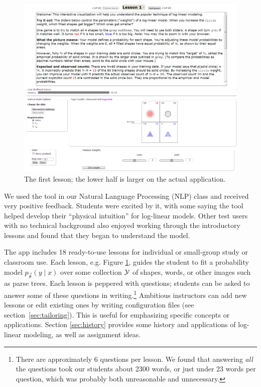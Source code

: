 \documentclass[11pt,letterpaper]{article}
\newcommand{\Note}[1]{}
\renewcommand{\Note}[1]{\hl{[#1]}}  %
\newcommand{\NoteSigned}[3]{{\sethlcolor{#2}\Note{#1: #3}}}
\newcommand{\NoteFF}[1]{\NoteSigned{FF}{LightBlue}{#1}}
\newcommand{\NoteJE}[1]{\NoteSigned{JE}{LightGreen}{#1}}
\newcommand{\NumLessons}[0]{18}%
\begin{document}
\begin{figure}
\centering
\includegraphics[scale=.435]{images/lesson1-060713-intro-zoom-3.PNG}
\caption{The first lesson; the lower half is larger on the actual
  application.}
\label{fig:lesson1}
\end{figure}

We used the tool in our Natural Language Processing (NLP) class and received
very positive feedback.  Students were excited by it, with some saying
the tool helped develop their ``physical intuition'' for log-linear
models.
Other test users with no 
technical background also enjoyed working
through the introductory lessons and found that they began to understand 
the model.

The app includes \NumLessons{} ready-to-use lessons for individual or
small-group study or classroom use.  Each lesson, e.g. Figure
\ref{fig:lesson1}, guides the student to fit a probability model $p_{\vec{\theta}}(y \mid
x)$ over some collection ${\cal Y}$ of shapes, words, or other images
such as parse trees.  Each lesson is peppered with questions; students
can be asked to answer some of these questions in
writing.\footnote{There are approximately 6 questions per lesson. We
  found that answering {\em all} the questions took our students about
  2300 words, or just under 23 words per question, which was probably
  both unreasonable and unnecessary.}  Ambitious instructors can add new
lessons or edit existing ones by writing configuration files (see
section~\ref{sec:tailoring}). This is useful for emphasizing specific
concepts or applications.
Section \ref{sec:history} provides some history and applications of log-linear
modeling, as well as assignment ideas.
\end{document}
